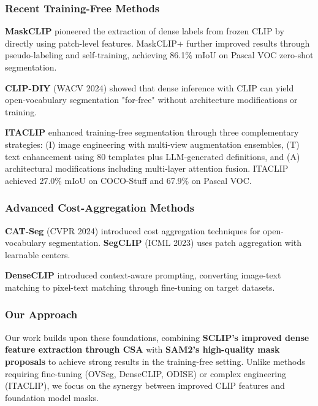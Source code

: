 \subsubsection{Recent Training-Free Methods}

\textbf{MaskCLIP} \cite{zhou2022extract} pioneered the extraction of dense labels from frozen CLIP by directly using patch-level features. MaskCLIP+ further improved results through pseudo-labeling and self-training, achieving 86.1\% mIoU on Pascal VOC zero-shot segmentation.

\textbf{CLIP-DIY} \cite{wysoczanska2024clipdiy} (WACV 2024) showed that dense inference with CLIP can yield open-vocabulary segmentation "for-free" without architecture modifications or training.

\textbf{ITACLIP} \cite{shao2024itaclip} enhanced training-free segmentation through three complementary strategies: (I) image engineering with multi-view augmentation ensembles, (T) text enhancement using 80 templates plus LLM-generated definitions, and (A) architectural modifications including multi-layer attention fusion. ITACLIP achieved 27.0\% mIoU on COCO-Stuff and 67.9\% on Pascal VOC.

\subsubsection{Advanced Cost-Aggregation Methods}

\textbf{CAT-Seg} \cite{cho2024catseg} (CVPR 2024) introduced cost aggregation techniques for open-vocabulary segmentation. \textbf{SegCLIP} \cite{lin2023segclip} (ICML 2023) uses patch aggregation with learnable centers.

\textbf{DenseCLIP} \cite{rao2022denseclip} introduced context-aware prompting, converting image-text matching to pixel-text matching through fine-tuning on target datasets.

\subsubsection{Our Approach}

Our work builds upon these foundations, combining \textbf{SCLIP's improved dense feature extraction through CSA} with \textbf{SAM2's high-quality mask proposals} to achieve strong results in the training-free setting. Unlike methods requiring fine-tuning (OVSeg, DenseCLIP, ODISE) or complex engineering (ITACLIP), we focus on the synergy between improved CLIP features and foundation model masks.

